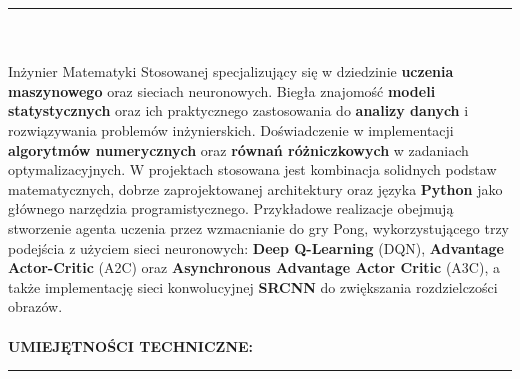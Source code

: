 \documentclass[10pt]{article}
\newcommand{\longline}{\rule{19.6cm}{1pt}}
\begin{document}
\noindent \longline 
\\ \\
\noindent Inżynier Matematyki Stosowanej specjalizujący się w dziedzinie \textbf{uczenia maszynowego} oraz sieciach neuronowych.
Biegła znajomość \textbf{modeli statystycznych} oraz ich praktycznego zastosowania do \textbf{analizy danych} i rozwiązywania problemów inżynierskich.
Doświadczenie w implementacji \textbf{algorytmów numerycznych} oraz \textbf{równań różniczkowych} w zadaniach optymalizacyjnych.
W projektach stosowana jest kombinacja solidnych podstaw matematycznych, dobrze zaprojektowanej architektury oraz języka \textbf{Python} jako głównego narzędzia programistycznego. 
Przykładowe realizacje obejmują stworzenie agenta uczenia przez wzmacnianie do gry Pong, wykorzystującego trzy podejścia z użyciem
sieci neuronowych: \textbf{Deep Q-Learning} (DQN), \textbf{Advantage Actor-Critic} (A2C) oraz \textbf{Asynchronous Advantage Actor Critic} (A3C), 
a także implementację sieci konwolucyjnej \textbf{SRCNN} do zwiększania rozdzielczości obrazów.
\\ \\
\noindent \fontsize{14pt}{14pt}\selectfont \textbf{\color{Violet}UMIEJĘTNOŚCI TECHNICZNE:}
\fontsize{10pt}{10pt}\selectfont 
\\ 
\noindent \longline 
\end{document}
